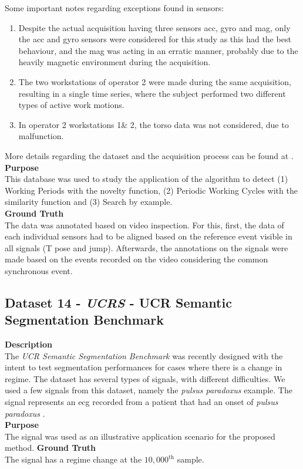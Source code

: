 Some important notes regarding exceptions found in sensors:
\begin{enumerate}
\item Despite the actual acquisition having three sensors \gls{acc}, \gls{gyro} and \gls{mag}, only the \gls{acc} and \gls{gyro} sensors were considered for this study as this had the best behaviour, and the \gls{mag} was acting in an erratic manner, probably due to the heavily magnetic environment during the acquisition.
\item The two workstations of operator 2 were made during the same acquisition, resulting in a single time series, where the subject performed two different types of active work motions.
\item In operator 2 workstations 1\& 2, the torso data was not considered, due to malfunction.
\end{enumerate}

More details regarding the dataset and the acquisition process can be found at \cite{santos2019, sara}.\\
\textbf{Purpose}\hfill \\
This database was used to study the application of the algorithm to detect (1) Working Periods with the novelty function, (2) Periodic Working Cycles with the similarity function and (3) Search by example. \\
\textbf{Ground Truth}\hfill \\
The data was annotated based on video inspection. For this, first, the data of each individual sensors had to be aligned based on the reference event visible in all signals (T pose and jump). Afterwards, the annotations on the signals were made based on the events recorded on the video considering the common synchronous event.

\subsection{Dataset 14 - \textit{UCRS} - UCR Semantic Segmentation Benchmark}
\label{dat:dataset15}

\textbf{Description}\\
The \textit{UCR Semantic Segmentation Benchmark} \cite{eamonn_segmentation} was recently designed with the intent to test segmentation performances for cases where there is a change in regime. The dataset has several types of signals, with different difficulties. We used a few signals from this dataset, namely the \textit{pulsus paradoxus} example. The signal represents an \gls{ecg} recorded from a patient that had an onset of \textit{pulsus paradoxus} \cite{pulsusparadoxus, pulsusparadoxus2}.\\
\textbf{Purpose}\\
The signal was used as an illustrative application scenario for the proposed method.
\textbf{Ground Truth}\\
The signal has a regime change at the $10,000^\text{th}$ sample.\\

